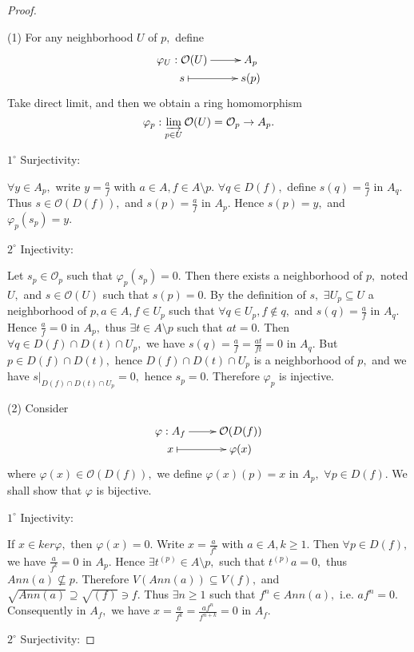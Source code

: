 \begin{proof}\
\enum
\item[(1)]For any neighborhood $U$ of $p,$ define
\[ \xymatrix@R=0em{
   {\varphi_U:\mathcal {O}(U)} \ar[r] & A_p     \\
   s \ar@{|->}[r] & s(p) }  \]
Take direct limit, and then we obtain a ring homomorphism
$$\varphi_p:\varinjlim_{p\in U}\mathcal {O}(U)=\mathcal {O}_p\rightarrow A_p.$$

$\mathit{1^{\circ}}$ Surjectivity:

$\forall y\in A_p,$ write $y=\frac{a}{f}$ with $a\in A,f\in
A\setminus p.$ $\forall q\in D(f),$ define $s(q)=\frac{a}{f}$ in
$A_q.$ Thus $s\in\mathcal {O}(D(f)),$ and $s(p)=\frac{a}{f}$ in
$A_p.$ Hence $s(p)=y,$ and $\varphi_p(s_p)=y.$

$\mathit{2^{\circ}}$ Injectivity:

Let $s_p\in\mathcal {O}_p$ such that $\varphi_p(s_p)=0.$ Then there
exists a neighborhood of $p,$ noted $U,$ and $s\in\mathcal {O}(U)$
such that $s(p)=0.$ By the definition of $s,$ $\exists U_p\subseteq
U$ a neighborhood of $p, a\in A,f\in U_p$ such that $\forall q\in
U_p,f\not\in q,$ and $s(q)=\frac{a}{f}$ in $A_q.$ Hence
$\frac{a}{f}=0$ in $A_p,$ thus $\exists t\in A\setminus p$ such that
$at=0.$ Then $\forall q\in D(f)\cap D(t)\cap U_p,$ we have
$s(q)=\frac{a}{f}=\frac{at}{ft}=0$ in $A_q.$ But $p\in D(f)\cap
D(t),$ hence $D(f)\cap D(t)\cap U_p$ is a neighborhood of $p,$ and
we have $\left.s\right|_{D(f)\cap D(t)\cap U_p}=0,$ hence $s_p=0.$
Therefore $\varphi_p$ is injective.
\item[(2)]Consider
\[ \xymatrix@R=0em{
   {\varphi:A_f} \ar[r] & \mathcal {O}(D(f))   \\
   x \ar@{|->}[r] & \varphi(x) }  \]
where $\varphi(x)\in\mathcal {O}(D(f)),$ we define $\varphi(x)(p)=x$
in $A_p,$ $\forall p\in D(f).$ We shall show that $\varphi$ is
bijective.

$\mathit{1^{\circ}}$ Injectivity:

If $x\in ker\varphi,$ then $\varphi(x)=0.$ Write $x=\frac{a}{f^k}$
with $a\in A,k\geqslant 1.$ Then $\forall p\in D(f),$ we have
$\frac{a}{f^k}=0$ in $A_p.$ Hence $\exists t^{(p)}\in A\setminus p,$
such that $t^{(p)}a=0,$ thus $Ann(a)\nsubseteq p.$ Therefore
$V(Ann(a))\subseteq V(f),$ and $\sqrt{Ann(a)}\supseteq\sqrt{(f)}\ni
f.$ Thus $\exists n\geqslant 1$ such that $f^n\in Ann(a),$ i.e.
$af^n=0.$ Consequently in $A_f,$ we have
$x=\frac{a}{f^k}=\frac{af^n}{f^{n+k}}=0$ in $A_f.$

$\mathit{2^{\circ}}$ Surjectivity:


\end{proof}
